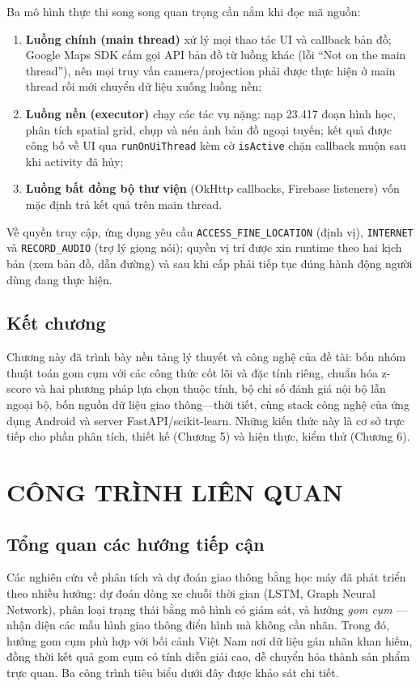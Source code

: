 Ba mô hình thực thi song song quan trọng cần nắm khi đọc mã nguồn:
\begin{enumerate}[label=(\arabic*),leftmargin=2.2cm,itemsep=2pt]
 \item \textbf{Luồng chính (main thread)} xử lý mọi thao tác UI và callback bản đồ; Google Maps SDK cấm gọi API bản đồ từ luồng khác (lỗi ``Not on the main thread''), nên mọi truy vấn camera/projection phải được thực hiện ở main thread rồi mới chuyển dữ liệu xuống luồng nền;
 \item \textbf{Luồng nền (executor)} chạy các tác vụ nặng: nạp 23.417 đoạn hình học, phân tích spatial grid, chụp và nén ảnh bản đồ ngoại tuyến; kết quả được công bố về UI qua \texttt{runOnUiThread} kèm cờ \texttt{isActive} chặn callback muộn sau khi activity đã hủy;
 \item \textbf{Luồng bất đồng bộ thư viện} (OkHttp callbacks, Firebase listeners) vốn mặc định trả kết quả trên main thread.
\end{enumerate}

Về quyền truy cập, ứng dụng yêu cầu \texttt{ACCESS\_FINE\_LOCATION} (định vị), \texttt{INTERNET} và \texttt{RECORD\_AUDIO} (trợ lý giọng nói); quyền vị trí được xin runtime theo hai kịch bản (xem bản đồ, dẫn đường) và sau khi cấp phải tiếp tục đúng hành động người dùng đang thực hiện.

\section{Kết chương}
Chương này đã trình bày nền tảng lý thuyết và công nghệ của đề tài: bốn nhóm thuật toán gom cụm với các công thức cốt lõi và đặc tính riêng, chuẩn hóa z-score và hai phương pháp lựa chọn thuộc tính, bộ chỉ số đánh giá nội bộ lẫn ngoại bộ, bốn nguồn dữ liệu giao thông---thời tiết, cùng stack công nghệ của ứng dụng Android và server FastAPI/scikit-learn. Những kiến thức này là cơ sở trực tiếp cho phần phân tích, thiết kế (Chương 5) và hiện thực, kiểm thử (Chương 6).

\chapter{CÔNG TRÌNH LIÊN QUAN}

\section{Tổng quan các hướng tiếp cận}
Các nghiên cứu về phân tích và dự đoán giao thông bằng học máy đã phát triển theo nhiều hướng: dự đoán dòng xe chuỗi thời gian (LSTM, Graph Neural Network), phân loại trạng thái bằng mô hình có giám sát, và hướng \textit{gom cụm} --- nhận diện các mẫu hình giao thông điển hình mà không cần nhãn. Trong đó, hướng gom cụm phù hợp với bối cảnh Việt Nam nơi dữ liệu gán nhãn khan hiếm, đồng thời kết quả gom cụm có tính diễn giải cao, dễ chuyển hóa thành sản phẩm trực quan. Ba công trình tiêu biểu dưới đây được khảo sát chi tiết.

